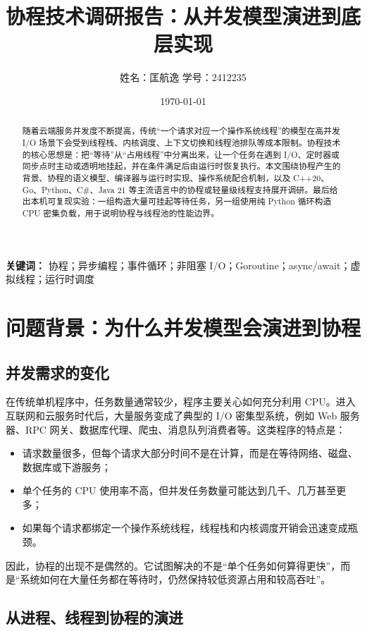 \documentclass[UTF8,zihao=-4]{ctexart}
\title{\heiti 协程技术调研报告：从并发模型演进到底层实现}
\author{姓名：匡航逸 \quad 学号：2412235}
\date{\today}
\begin{document}
\maketitle

\begin{abstract}
随着云端服务并发度不断提高，传统“一个请求对应一个操作系统线程”的模型在高并发 I/O 场景下会受到线程栈、内核调度、上下文切换和线程池排队等成本限制。协程技术的核心思想是：把“等待”从“占用线程”中分离出来，让一个任务在遇到 I/O、定时器或同步点时主动或透明地挂起，并在条件满足后由运行时恢复执行。本文围绕协程产生的背景、协程的语义模型、编译器与运行时实现、操作系统配合机制，以及 C++20、Go、Python、C\#、Java 21 等主流语言中的协程或轻量级线程支持展开调研。最后给出本机可复现实验：一组构造大量可挂起等待任务，另一组使用纯 Python 循环构造 CPU 密集负载，用于说明协程与线程池的性能边界。
\end{abstract}

\noindent\textbf{关键词：} 协程；异步编程；事件循环；非阻塞 I/O；Goroutine；async/await；虚拟线程；运行时调度

\tableofcontents
\newpage

\section{问题背景：为什么并发模型会演进到协程}

\subsection{并发需求的变化}

在传统单机程序中，任务数量通常较少，程序主要关心如何充分利用 CPU。进入互联网和云服务时代后，大量服务变成了典型的 I/O 密集型系统，例如 Web 服务器、RPC 网关、数据库代理、爬虫、消息队列消费者等。这类程序的特点是：

\begin{itemize}
  \item 请求数量很多，但每个请求大部分时间不是在计算，而是在等待网络、磁盘、数据库或下游服务；
  \item 单个任务的 CPU 使用率不高，但并发任务数量可能达到几千、几万甚至更多；
  \item 如果每个请求都绑定一个操作系统线程，线程栈和内核调度开销会迅速变成瓶颈。
\end{itemize}

因此，协程的出现不是偶然的。它试图解决的不是“单个任务如何算得更快”，而是“系统如何在大量任务都在等待时，仍然保持较低资源占用和较高吞吐”。

\subsection{从进程、线程到协程的演进}
\end{document}

